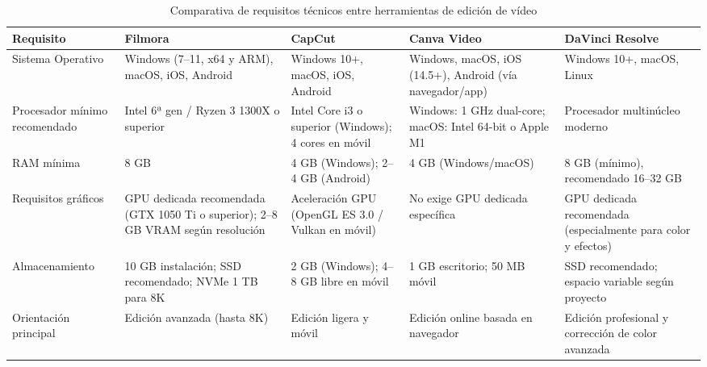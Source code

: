 \begin{table}[H]
\centering
\footnotesize
\begin{tabularx}{\textwidth}{|p{3cm}|Y|Y|Y|Y|}
\hline
\textbf{Requisito} & \textbf{Filmora} & \textbf{CapCut} & \textbf{Canva Video} & \textbf{DaVinci Resolve} \\ \hline

Sistema Operativo &
Windows (7–11, x64 y ARM), macOS, iOS, Android &
Windows 10+, macOS, iOS, Android &
Windows, macOS, iOS (14.5+), Android (vía navegador/app) &
Windows 10+, macOS, Linux \\ \hline

Procesador mínimo recomendado &
Intel 6ª gen / Ryzen 3 1300X o superior &
Intel Core i3 o superior (Windows); 4 cores en móvil &
Windows: 1 GHz dual-core; macOS: Intel 64-bit o Apple M1 &
Procesador multinúcleo moderno \\ \hline

RAM mínima &
8 GB &
4 GB (Windows); 2–4 GB (Android) &
4 GB (Windows/macOS) &
8 GB (mínimo), recomendado 16–32 GB \\ \hline

Requisitos gráficos &
GPU dedicada recomendada (GTX 1050 Ti o superior); 2–8 GB VRAM según resolución &
Aceleración GPU (OpenGL ES 3.0 / Vulkan en móvil) &
No exige GPU dedicada específica &
GPU dedicada recomendada (especialmente para color y efectos) \\ \hline

Almacenamiento &
10 GB instalación; SSD recomendado; NVMe 1 TB para 8K &
2 GB (Windows); 4–8 GB libre en móvil &
1 GB escritorio; 50 MB móvil &
SSD recomendado; espacio variable según proyecto \\ \hline

Orientación principal &
Edición avanzada (hasta 8K) &
Edición ligera y móvil &
Edición online basada en navegador &
Edición profesional y corrección de color avanzada \\ \hline

\end{tabularx}
\caption{Comparativa de requisitos técnicos entre herramientas de edición de vídeo}
\label{tab:requisitos-tecnicos}
\end{table}

